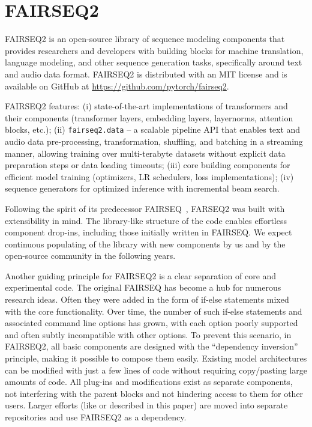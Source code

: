 \section{FAIRSEQ2}

FAIRSEQ2 is an open-source library of sequence modeling components that provides researchers and developers with building blocks for machine translation, language modeling, and other sequence generation tasks, specifically around text and audio data format. FAIRSEQ2 is distributed with an MIT license and is available on GitHub at \href{https://github.com/pytorch/fairseq2}{https://github.com/pytorch/fairseq2}.

FAIRSEQ2 features: 
(i) state-of-the-art implementations of transformers and their components (transformer layers, embedding layers, layernorms, attention blocks, etc.);%
(ii) \texttt{fairseq2.data} --  a scalable pipeline API that enables text and audio data pre-processing, transformation, shuffling, and batching in a streaming manner, allowing training over multi-terabyte datasets without explicit data preparation steps or data loading timeouts; (iii) core building components for efficient model training (optimizers, LR schedulers, loss implementations); (iv) sequence generators for optimized inference with incremental beam search. %

Following the spirit of its predecessor FAIRSEQ~\citep{ott2019fairseq}, FARSEQ2 was built with extensibility in mind. The library-like structure of the code enables effortless component drop-ins, including those initially written in FAIRSEQ. 
We expect continuous populating of the library with new components by us and by the open-source community in the following years.
%

Another guiding principle for FAIRSEQ2 is a clear separation of core and experimental code. 
The original FAIRSEQ has become a hub for numerous research ideas. 
Often they were added in the form of if-else statements mixed with the core functionality. 
Over time, the number of such if-else statements and associated command line options has grown, with each option poorly supported and often subtly incompatible with other options. 
To prevent this scenario, in FAIRSEQ2, all basic components are designed with the “dependency inversion” principle, making it possible to compose them easily. 
Existing model architectures can be modified with just a few lines of code without requiring copy/pasting large amounts of code. All plug-ins and modifications exist as separate components, not interfering with the parent blocks and not hindering access to them for other users. Larger efforts (like \unity or \sonar described in this paper) are moved into separate repositories and use FAIRSEQ2 as a dependency.


